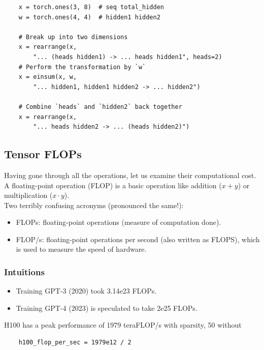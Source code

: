 \documentclass[12pt,twoside]{article}
\begin{document}
\begin{verbatim}
    x = torch.ones(3, 8)  # seq total_hidden 
    w = torch.ones(4, 4)  # hidden1 hidden2 
    
    # Break up into two dimensions
    x = rearrange(x, 
        "... (heads hidden1) -> ... heads hidden1", heads=2)  
    # Perform the transformation by `w`
    x = einsum(x, w, 
        "... hidden1, hidden1 hidden2 -> ... hidden2")  
    
    # Combine `heads` and `hidden2` back together
    x = rearrange(x, 
        "... heads hidden2 -> ... (heads hidden2)")  
\end{verbatim}

\subsection*{Tensor FLOPs}

Having gone through all the operations, let us examine their computational cost. \\

A floating-point operation (FLOP) is a basic operation like addition (\(x + y\)) or multiplication (\(x \cdot y\)). \\

Two terribly confusing acronyms (pronounced the same!):

\begin{itemize}
    \item FLOPs: floating-point operations (measure of computation done).
    \item FLOP/s: floating-point operations per second (also written as FLOPS), which is used to measure the speed of hardware.
\end{itemize}

\subsubsection*{Intuitions}

\begin{itemize}
    \item Training GPT-3 (2020) took 3.14e23 FLOPs. 
    \item Training GPT-4 (2023) is speculated to take 2e25 FLOPs.
\end{itemize}

H100 has a peak performance of 1979 teraFLOP/s with sparsity, 50 without

\begin{verbatim}
    h100_flop_per_sec = 1979e12 / 2
\end{verbatim}
\end{document}
